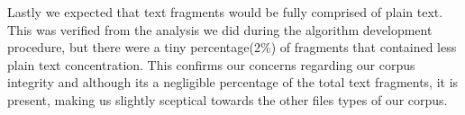 Lastly we expected that text fragments would be fully comprised of plain text. This was verified from the analysis we did during the algorithm development procedure, but there were a tiny percentage(2\%) of fragments that contained less plain text concentration. This confirms our concerns regarding our corpus integrity and although its a negligible percentage of the total text fragments, it is present, making us slightly sceptical towards the other files types of our corpus.